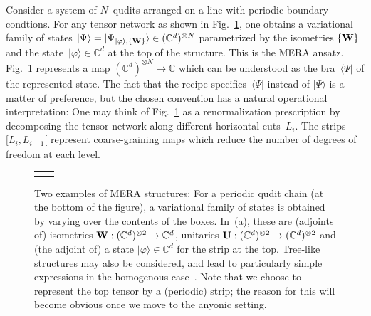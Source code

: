 \documentclass[floats,prb,twocolumn]{revtex4}
\newcommand{\ket}[1]{|#1\rangle}
\newcommand{\bra}[1]{\langle#1|}
\newcommand*{\Xisometry}{{\bf W}}
\newcommand*{\Xunitary}{{\bf U}}
\newcommand*{\merafirst}{\raisebox{-85.626pt}{\epsfig{file=merafirst1.eps,clip=}}}
\newcommand*{\merasecond}{\raisebox{-74.286pt}{\epsfig{file=merasecond31.eps,clip=}}}
\begin{document}
Consider a system of $N$~qudits arranged on  a line with periodic boundary condtions. For any tensor network as shown in Fig.~\ref{fig:MERA}, one obtains a variational family of states $\ket{\Psi}=\ket{\Psi_{\ket{\varphi},\{\Xisometry\}}}\in(\mathbb{C}^d)^{\otimes N}$ parametrized by  the isometries $\{\Xisometry\}$ and the state~$\ket{\varphi}\in\mathbb{C}^d$ at the top of the structure. This is the MERA ansatz.  Fig.~\ref{fig:MERA} represents a map $(\mathbb{C}^d)^{\otimes N}\rightarrow\mathbb{C}$ which can be understood as the bra~$\bra{\Psi}$ of the represented state. The fact that the recipe specifies~$\bra{\Psi}$ instead of $\ket{\Psi}$ is a matter of preference, but the chosen convention has a natural operational interpretation: One may think of Fig.~\ref{fig:MERA} as a renormalization prescription by decomposing the tensor network along different horizontal cuts~$L_i$. The strips $[L_{i},L_{i+1}[$ represent coarse-graining maps which reduce the number of degrees of freedom at each level. 
 

\begin{figure}
\centering
\begin{tabular}{cc }
\hspace{-0.5cm}\subfigure[]{\label{f:merafirst}\scalebox{0.9}{\merafirst}}
&
\hspace{-0.5cm}\subfigure[]{\label{f:merasecond}\scalebox{0.9}{\merasecond}}
\end{tabular}
\caption{Two examples of MERA structures: For a periodic qudit chain (at the bottom of the figure), a variational family of states is obtained by varying over the contents of the boxes. In~(a), these are (adjoints of) isometries $\Xisometry:(\mathbb{C}^{d})^{\otimes 2}\rightarrow\mathbb{C}^d$, unitaries $\Xunitary:(\mathbb{C}^d)^{\otimes 2}\rightarrow (\mathbb{C}^d)^{\otimes 2}$ and (the adjoint of) a state $\ket{\varphi}\in \mathbb{C}^d$ for the strip at the top. 
Tree-like structures may also be considered, and lead to particularly simple expressions in the homogenous case~\cite{silvietal09}.  Note that we choose to represent the top tensor by a (periodic) strip; the reason for this will become obvious once we move to the anyonic setting.\label{fig:MERA}}
\end{figure}
\end{document}
